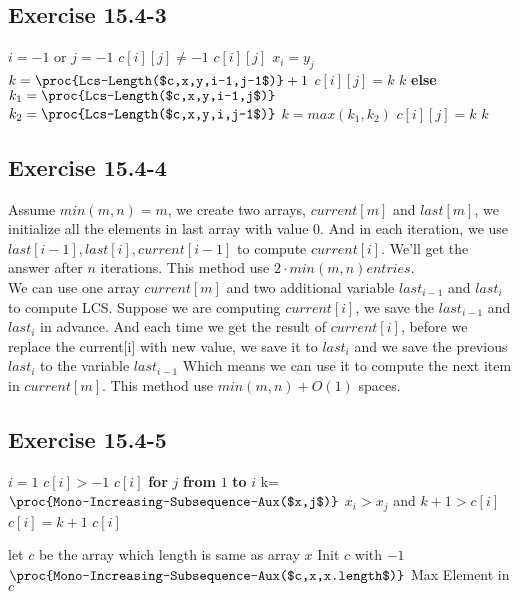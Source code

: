 \documentclass[12pt]{article}
\theoremstyle{definition}
\theoremstyle{remark}
\begin{document}
\subsection*{Exercise 15.4-3}
\begin{codebox}
\li \If $i=-1$ or $j=-1$ \label{li:if}
\li \quad {}
\li \If $c[i][j]\ne -1$ \label{li:if}
\li \quad \Return $c[i][j]$
\li \If $x_i=y_j$ \label{li:if}
\li \quad $k=\proc{Lcs-Length($c,x,y,i-1,j-1$)}+1$
\li \quad $c[i][j]=k$
\li \quad \Return $k$
\li \textbf{else}
\li \quad $k_1=\proc{Lcs-Length($c,x,y,i-1,j$)}$
\li \quad $k_2=\proc{Lcs-Length($c,x,y,i,j-1$)}$
\li \quad $k=max(k_1,k_2)$
\li \quad $c[i][j]=k$
\li \quad \Return $k$
\end{codebox}
\subsection*{Exercise 15.4-4}
Assume $min(m,n)=m$, we create two arrays, $current[m]$ and $last[m]$, we initialize all the elements in last array with value 0. And in each iteration, we use $last[i-1],last[i],current[i-1]$ to compute $current[i]$. We'll get the answer after $n$ iterations. This method use $2\cdot min(m,n) entries$.\\
We can use one array $current[m]$ and two additional variable $last_{i-1}$ and $last_i$ to compute LCS. Suppose we are computing $current[i]$, we save the $last_{i-1}$ and $last_i$ in advance. And each time we get the result of $current[i]$, before we replace the current[i] with new value, we save it to $last_i$ and we save the previous $last_i$ to the variable $last_{i-1}$ Which means we can use it to compute the next item in $current[m]$. This method use $min(m,n)+O(1)$ spaces.
\subsection*{Exercise 15.4-5}
\begin{codebox}
\li \If $i=1$ \label{li:if}
\li \quad {}
\li \If $c[i]>-1$ \label{li:if}
\li \quad \Return $c[i]$
\li \textbf{for} $j$ \textbf{from} $1$ \textbf{to} $i$
\li \quad k=$\proc{Mono-Increasing-Subsequence-Aux($x,j$)}$
\li \quad \If $x_i>x_j$ and $k+1>c[i]$ \label{li:if}
\li \qquad $c[i]=k+1$
\li \Return $c[i]$
\end{codebox}
\begin{codebox}
\li let $c$ be the array which length is same as array $x$
\li Init $c$ with $-1$
\li $\proc{Mono-Increasing-Subsequence-Aux($c,x,x.length$)}$
\li \Return Max Element in $c$
\end{codebox}
\end{document}
